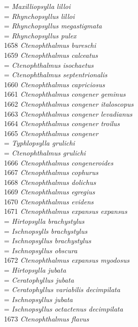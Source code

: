 \documentclass[
]{article}
\begin{document}
= \emph{Maxilliopsylla lilloi}\\
= \emph{Rhynchopsyllus lilloi}\\
= \emph{Rhynchopsyllus megastigmata}\\
= \emph{Rhynchopsyllus pulex}\\
1658 \emph{Ctenophthalmus bureschi}\\
1659 \emph{Ctenophthalmus calceatus}\\
= \emph{Ctenophthalmus isochaetus}\\
= \emph{Ctenophthalmus septentrionalis}\\
1660 \emph{Ctenophthalmus capriciosus}\\
1661 \emph{Ctenophthalmus congener geminus}\\
1662 \emph{Ctenophthalmus congener italoscopus}\\
1663 \emph{Ctenophthalmus congener levadianus}\\
1664 \emph{Ctenophthalmus congener troilus}\\
1665 \emph{Ctenophthalmus congener}\\
= \emph{Typhlopsylla grulichi}\\
= \emph{Ctenophthalmus grulichi}\\
1666 \emph{Ctenophthalmus congeneroides}\\
1667 \emph{Ctenophthalmus cophurus}\\
1668 \emph{Ctenophthalmus dolichus}\\
1669 \emph{Ctenophthalmus egregius}\\
1670 \emph{Ctenophthalmus evidens}\\
1671 \emph{Ctenophthalmus expansus expansus}\\
= \emph{Hirtopsylla brachystylus}\\
= \emph{Ischnopsylls brachystylus}\\
= \emph{Ischnopsyllus brachystylus}\\
= \emph{Ischnopsyllus obscura}\\
1672 \emph{Ctenophthalmus expansus myodosus}\\
= \emph{Hirtopsylla jubata}\\
= \emph{Ceratophyllus jubata}\\
= \emph{Ceratophyllus variabilis decimpilata}\\
= \emph{Ischnopsyllus jubata}\\
= \emph{Ischnopsyllus octactenus decimpilata}\\
1673 \emph{Ctenophthalmus flavus}\\
\end{document}
